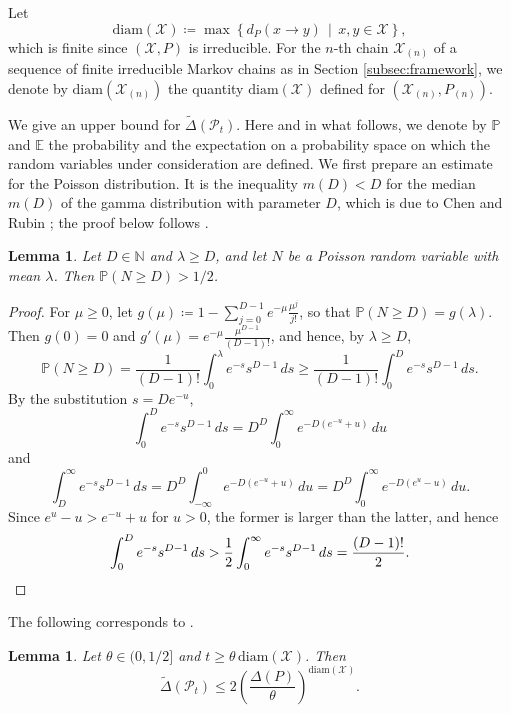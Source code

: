 \documentclass[a4paper, reqno, 11pt]{amsart}
\newtheorem{Lem}[Thm]{Lemma}
\theoremstyle{definition}
\begin{document}
Let
\[ \mathrm{diam}(\mathcal{X}) \coloneqq \max\left\{d_{P}(x \to y) \,\middle|\, x, y \in \mathcal{X}\right\}, \]
which is finite since $(\mathcal{X}, P)$ is irreducible.
For the $n$-th chain $\mathcal{X}_{(n)}$ of a sequence of finite irreducible Markov chains as in Section \ref{subsec:framework},
we denote by $\mathrm{diam}(\mathcal{X}_{(n)})$ the quantity $\mathrm{diam}(\mathcal{X})$ defined for $(\mathcal{X}_{(n)}, P_{(n)})$. 


We give an upper bound for $\widetilde{\Delta}(\mathscr{P}_t)$.
Here and in what follows, we denote by $\mathbb{P}$ and $\mathbb{E}$ the probability and the expectation on a probability space on which the random variables under consideration are defined.
We first prepare an estimate for the Poisson distribution.
It is the inequality $m(D) < D$ for the median $m(D)$ of the gamma distribution with parameter $D$, which is due to Chen and Rubin \cite{ChenRubin1986}; the proof below follows \cite{ChenRubin1986, BergPedersen2006}. 

\begin{Lem}\label{lem:poisson-median}
Let $D \in \mathbb{N}$ and $\lambda \ge D$, and let $N$ be a Poisson random variable with mean $\lambda$.
Then $\mathbb{P}(N \ge D) > 1/2$.
\end{Lem}

\begin{proof}
For $\mu \ge 0$, let $g(\mu) \coloneqq 1 - \sum_{j=0}^{D-1} e^{-\mu} \frac{\mu^{j}}{j!}$, so that $\mathbb{P}(N \ge D) = g(\lambda)$.
Then $g(0) = 0$ and $g'(\mu) = e^{-\mu} \frac{\mu^{D-1}}{(D-1)!}$, and hence, by $\lambda \ge D$,
\[ \mathbb{P}(N \ge D) = \frac{1}{(D-1)!} \int_{0}^{\lambda} e^{-s} s^{D-1}\, ds
 \ge \frac{1}{(D-1)!} \int_{0}^{D} e^{-s} s^{D-1}\, ds. \]
By the substitution $s = D e^{-u}$,
\[ \int_{0}^{D} e^{-s} s^{D-1}\, ds = D^{D} \int_{0}^{\infty} e^{-D(e^{-u} + u)}\, du \]
and
\[ \int_{D}^{\infty} e^{-s} s^{D-1}\, ds = D^{D} \int_{-\infty}^{0} e^{-D(e^{-u} + u)}\, du = D^{D} \int_{0}^{\infty} e^{-D(e^{u} - u)}\, du. \]
Since $e^{u} - u > e^{-u} + u$ for $u > 0$, the former is larger than the latter, and hence
\[ \int_{0}^{D} e^{-s} s^{D-1}\, ds > \frac{1}{2} \int_{0}^{\infty} e^{-s} s^{D-1}\, ds = \frac{(D-1)!}{2}. \qedhere \]
\end{proof}

The following corresponds to  \cite[Eq. (16)]{Salez2024}. 

\begin{Lem}\label{lem:Pt-upper}
Let $\theta \in (0, 1/2]$ and $t \ge \theta\,\mathrm{diam}(\mathcal{X})$. Then
\[ \widetilde{\Delta}(\mathscr{P}_t) \le 2 \left(\frac{\Delta(P)}{\theta}\right)^{\mathrm{diam}(\mathcal{X})}. \]
\end{Lem}
\end{document}
